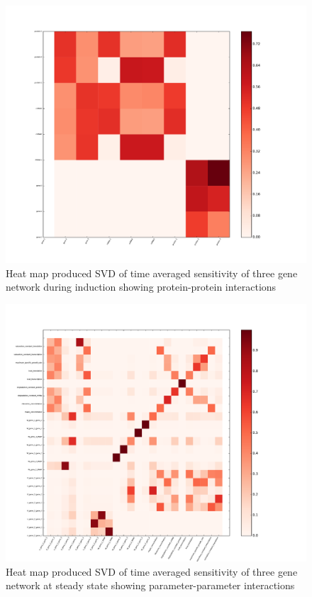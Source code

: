 \documentclass{article}
\begin{document}
\begin{figure}[!htb]
\includegraphics[width=12cm]{../ThreeGeneRachelV2/figures/ProteinInteractionsFrom10to70}
\caption{Heat map produced SVD of time averaged sensitivity of three gene network during induction showing protein-protein interactions}
\end{figure}

 \begin{figure}[!htb]
\includegraphics[width=12cm]{../ThreeGeneRachelV2/figures/ParameterInteractionsFrom0to10}
\caption{Heat map produced SVD of time averaged sensitivity of three gene network at steady state showing parameter-parameter interactions}
\end{figure}
\end{document}
